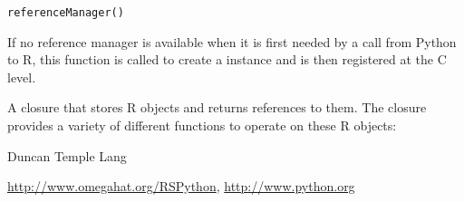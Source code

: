 \begin{Description}\relax
\end{Description}
\begin{Usage}
\begin{verbatim}
referenceManager()
\end{verbatim}
\end{Usage}
\begin{Details}\relax
If no reference manager is available when it is first needed
by a call from Python to R, this function is called to create
a  instance and is then registered
at the C level.\end{Details}
\begin{Value}
A closure that stores R objects and returns
references to them. The closure provides a variety of different
functions to operate on these R objects:
\begin{ldescription}
\item[\code{handler}] 
\item[\code{createReference}] 
\item[\code{addReference}] 
\item[\code{remove}] 
\item[\code{getReference}] 
\item[\code{references}] 
\item[\code{total}] 
\end{ldescription}
\end{Value}
\begin{Author}\relax
Duncan Temple Lang\end{Author}
\begin{References}\relax
\url{http://www.omegahat.org/RSPython},
\url{http://www.python.org}\end{References}
\begin{SeeAlso}\relax
{}
\end{SeeAlso}
\begin{Examples}
\begin{ExampleCode}

\end{ExampleCode}
\end{Examples}

